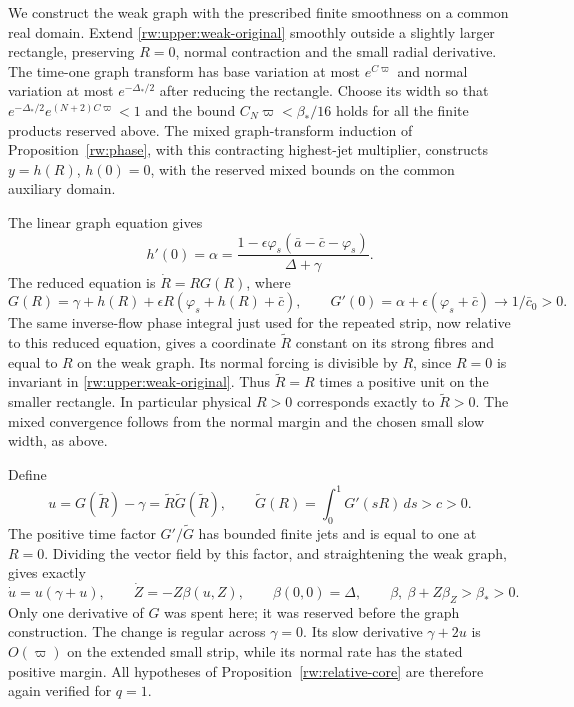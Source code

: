 We construct the weak graph with the prescribed finite smoothness on
a common real domain. Extend \eqref{rw:upper:weak-original} smoothly
outside a slightly larger rectangle, preserving $R=0$, normal
contraction and the small radial derivative. The time-one graph
transform has base variation at most $e^{C\varpi}$ and normal
variation at most $e^{-\Delta_*/2}$ after reducing the rectangle.
Choose its width so that
$e^{-\Delta_*/2}e^{(N+2)C\varpi}<1$ and the bound
$C_N\varpi<\beta_*/16$ holds for all the finite products reserved
above.
The mixed graph-transform induction of Proposition~\ref{rw:phase}, with
this contracting highest-jet multiplier, constructs $y=h(R)$,
$h(0)=0$, with the reserved mixed bounds on the common auxiliary domain.

The linear graph equation gives
\[
 h'(0)=\alpha=
 \frac{1-\epsilon\varphi_s(\bar a-\bar c-\varphi_s)}{\Delta+\gamma}.
\]
The reduced equation is $\dot R=RG(R)$, where
\begin{equation}\label{rw:upper:weak-G}
 G(R)=\gamma+h(R)+\epsilon R(\varphi_s+h(R)+\bar c),\qquad
 G'(0)=\alpha+\epsilon(\varphi_s+\bar c)\longrightarrow1/\bar c_0>0.
\end{equation}
The same inverse-flow phase integral just used for the repeated strip,
now relative to this reduced equation, gives a coordinate
$\widetilde R$ constant on its strong fibres and equal to $R$ on the
weak graph. Its normal forcing is divisible by $R$, since $R=0$ is
invariant in \eqref{rw:upper:weak-original}. Thus
$\widetilde R=R$ times a positive unit on the smaller rectangle.
In particular physical $R>0$ corresponds exactly to
$\widetilde R>0$. The mixed convergence follows from the normal
margin and the chosen small slow width, as above.

Define
\[
 u=G(\widetilde R)-\gamma=\widetilde R\widetilde G(\widetilde R),
 \qquad \widetilde G(R)=\int_0^1G'(sR)\,ds>c>0.
\]
The positive time factor $G'/\widetilde G$ has bounded finite jets and
is equal to one at $R=0$. Dividing the vector field by this factor,
and straightening the weak graph, gives exactly
\begin{equation}\label{rw:upper:weak-normal}
 \dot u=u(\gamma+u),\qquad \dot Z=-Z\beta(u,Z),\qquad
 \beta(0,0)=\Delta,\qquad
 \beta,\ \beta+Z\beta_Z>\beta_*>0.
\end{equation}
Only one derivative of $G$ was spent here; it was reserved before the
graph construction.  The change is regular across $\gamma=0$.
Its slow derivative $\gamma+2u$ is $O(\varpi)$ on the extended small
strip, while its normal rate has the stated positive margin. All
hypotheses of Proposition~\ref{rw:relative-core} are therefore again
verified for $q=1$.

